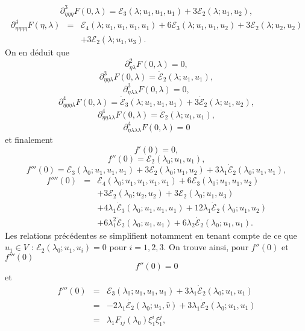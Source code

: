 \documentclass{article}
\newcommand{\nosymbol}{}
\begin{document}
\[ \partial_{\eta  \eta  \eta}^3 F (0, \lambda) =\mathcal{E}_3
   (\lambda ; u_1, u_1, u_1) + 3\mathcal{E}_2 (\lambda ; u_1, u_2), \]
\begin{eqnarray}
  \partial_{\eta  \eta  \eta  \eta}^4 F (\eta,
  \lambda) & = & \mathcal{E}_4 (\lambda ; u_1, u_1, u_1, u_1) + 6\mathcal{E}_3
  (\lambda ; u_1, u_1, u_2) + 3\mathcal{E}_2 (\lambda ; u_2, u_2) \nonumber\\
  &  & \nosymbol + 3\mathcal{E}_2 (\lambda ; u_1, u_3) . \nonumber
\end{eqnarray}
On en déduit que
\[ \partial_{\eta  \lambda}^2 F (0, \lambda) = 0, \]
\[ \partial_{\eta  \eta  \lambda}^3 F (0, \lambda) =
   \dot{\mathcal{E}}_2 (\lambda ; u_1, u_1), \]
\[ \partial_{\eta  \lambda  \lambda}^3 F (0, \lambda) = 0, \]
\[ \partial_{\eta  \eta  \eta  \lambda}^4 F (0,
   \lambda) = \dot{\mathcal{E}}_3 (\lambda ; u_1, u_1, u_1) + 3
   \dot{\mathcal{E}}_2 (\lambda ; u_1, u_2), \text{} \text{} \]
\[ \partial_{\eta  \eta  \lambda  \lambda}^4 F (0,
   \lambda) = \ddot{\mathcal{E}}_2 (\lambda ; u_1, u_1), \]
\[ \partial_{\eta  \lambda  \lambda  \lambda}^4 F (0,
   \lambda) = 0 \]
et finalement
\[ f' (0) = 0, \]
\[ f'' (0) =\mathcal{E}_2 (\lambda_0 ; u_1, u_1), \]
\[ f''' (0) =\mathcal{E}_3 (\lambda_0 ; u_1, u_1, u_1) + 3\mathcal{E}_2
   (\lambda_0 ; u_1, u_2) + 3 \lambda_1  \dot{\mathcal{E}}_2 (\lambda_0 ; u_1,
   u_1), \]
\begin{eqnarray}
  f'''' (0) & = & \mathcal{E}_4 (\lambda_0 ; u_1, u_1, u_1, u_1) +
  6\mathcal{E}_3 (\lambda_0 ; u_1, u_1, u_2) \nonumber\\
  &  & \nosymbol + 3\mathcal{E}_2 (\lambda_0 ; u_2, u_2) + 3\mathcal{E}_2
  (\lambda_0 ; u_1, u_3) \nonumber\\
  &  & \nosymbol + 4 \lambda_1  \dot{\mathcal{E}}_3 (\lambda_0 ; u_1, u_1,
  u_1) + 12 \lambda_1  \dot{\mathcal{E}}_2 (\lambda_0 ; u_1, u_2) \nonumber\\
  &  & \nosymbol + 6 \lambda_1^2  \ddot{\mathcal{E}}_2 (\lambda_0 ; u_1, u_1)
  + 6 \lambda_2  \dot{\mathcal{E}}_2 (\lambda_0 ; u_1, u_1) . \nonumber
\end{eqnarray}
Les relations précédentes se simplifient notamment en tenant compte de
ce que $u_1 \in V$ : $\mathcal{E}_2 (\lambda_0 ; u_1, u_i) = 0$ pour $i = 1,
2, 3$. On trouve ainsi, pour $f'' (0)$ et $f''' (0)$
\begin{equation}
  \label{eq:DL energie derivee 2nde} f'' (0) = 0
\end{equation}
et
\begin{eqnarray}
  f''' (0) & = & \mathcal{E}_3 (\lambda_0 ; u_1, u_1, u_1) + 3 \lambda_1
  \dot{\mathcal{E}}_2 (\lambda_0 ; u_1, u_1) \nonumber\\
  & = & - 2 \lambda_1  \dot{\mathcal{E}_2} (\lambda_0 ; u_1, \hat{v}) + 3
  \lambda_1  \dot{\mathcal{E}}_2 (\lambda_0 ; u_1, u_1) \nonumber\\
  & = & \lambda_1 F_{i  j} (\lambda_0) \xi_1^i \xi_1^j,  \label{eq:DL
  energie derivee 3ieme}
\end{eqnarray}
\end{document}
